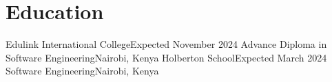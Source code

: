 \section{Education}
    \resumeSubHeadingListStart

    \resumeSubheading
    {Edulink International College}{Expected November 2024}
    {Advance Diploma in Software Engineering}{Nairobi, Kenya}
    \resumeSubheading
    {Holberton School}{Expected March 2024}
    {Software Engineering}{Nairobi, Kenya}

    \resumeSubHeadingListEnd